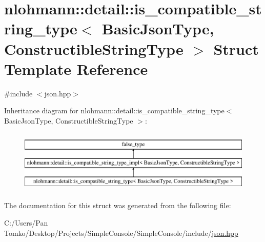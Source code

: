 \hypertarget{structnlohmann_1_1detail_1_1is__compatible__string__type}{}\section{nlohmann\+::detail\+::is\+\_\+compatible\+\_\+string\+\_\+type$<$ Basic\+Json\+Type, Constructible\+String\+Type $>$ Struct Template Reference}
\label{structnlohmann_1_1detail_1_1is__compatible__string__type}


{\ttfamily \#include $<$json.\+hpp$>$}

Inheritance diagram for nlohmann\+::detail\+::is\+\_\+compatible\+\_\+string\+\_\+type$<$ Basic\+Json\+Type, Constructible\+String\+Type $>$\+:\begin{figure}[H]
\begin{center}
\leavevmode
\includegraphics[height=3.000000cm]{db/d4e/structnlohmann_1_1detail_1_1is__compatible__string__type}
\end{center}
\end{figure}


The documentation for this struct was generated from the following file\+:\begin{DoxyCompactItemize}
\item 
C\+:/\+Users/\+Pan Tomko/\+Desktop/\+Projects/\+Simple\+Console/\+Simple\+Console/include/\mbox{\hyperlink{json_8hpp}{json.\+hpp}}\end{DoxyCompactItemize}
